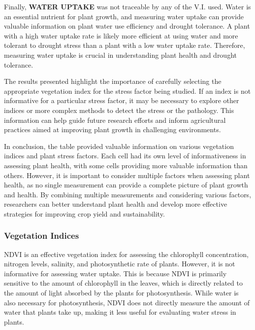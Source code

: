 \documentclass{article}
\begin{document}
                    Finally, \textbf{WATER UPTAKE} was not traceable by any of the V.I. used. Water is an essential nutrient for plant growth, and measuring water uptake can provide valuable information on plant water use efficiency and drought tolerance. A plant with a high water uptake rate is likely more efficient at using water and more tolerant to drought stress than a plant with a low water uptake rate. Therefore, measuring water uptake is crucial in understanding plant health and drought tolerance.\par
                    \vspace*{1\baselineskip}
                    
                    
                    The results presented highlight the importance of carefully selecting the appropriate vegetation index for the stress factor being studied. If an index is not informative for a particular stress factor, it may be necessary to explore other indices or more complex methods to detect the stress or the pathology. This information can help guide future research efforts and inform agricultural practices aimed at improving plant growth in challenging environments.\par
                    \vspace*{1\baselineskip}
                    
                    In conclusion, the table provided valuable information on various vegetation indices and plant stress factors. Each cell had its own level of informativeness in assessing plant health, with some cells providing more valuable information than others. However, it is important to consider multiple factors when assessing plant health, as no single measurement can provide a complete picture of plant growth and health. By combining multiple measurements and considering various factors, researchers can better understand plant health and develop more effective strategies for improving crop yield and sustainability.\par
                    
                    \newpage
                    
                    \subsubsection{Vegetation Indices}
                    
                    NDVI is an effective vegetation index for assessing the chlorophyll concentration, nitrogen levels, salinity, and photosynthetic rate of plants. However, it is not informative for assessing water uptake. This is because NDVI is primarily sensitive to the amount of chlorophyll in the leaves, which is directly related to the amount of light absorbed by the plants for photosynthesis. While water is also necessary for photosynthesis, NDVI does not directly measure the amount of water that plants take up, making it less useful for evaluating water stress in plants.\par
                    \vspace*{1\baselineskip}
\end{document}
